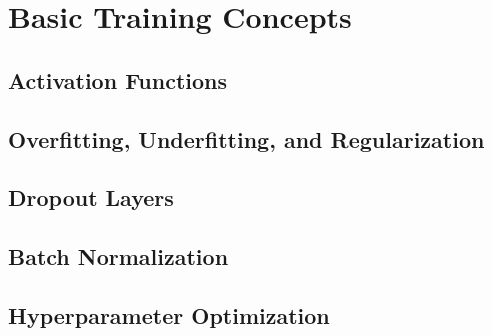 \section{Basic Training Concepts}

\subsection*{Activation Functions}

\subsection*{Overfitting, Underfitting, and Regularization}

\subsection*{Dropout Layers}

\subsection*{Batch Normalization}

\subsection*{Hyperparameter Optimization}